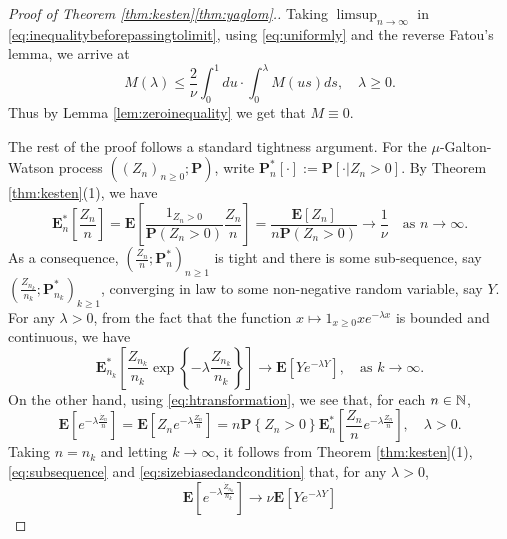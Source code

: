 \documentclass[12pt]{amsart}
\numberwithin{equation}{section}
\newcommand{\prob}{\mathbf P}
\newcommand{\brac}[1]{\left[ #1 \right]}
\newcommand{\set}[1]{\left\{ #1 \right\}}
\newcommand{\expct}{\mathbf E}
\begin{document}
\begin{proof}[Proof of Theorem \ref{thm:kesten}\eqref{thm:yaglom}.]
    Taking $\limsup_{n\to\infty}$ in
    \eqref{eq:inequalitybeforepassingtolimit}, using \eqref{eq:uniformly} and the reverse Fatou's lemma, we arrive at
\begin{equation*}
	    M(\lambda)
    \leq
        \frac{2}{\nu}\int_0^1du
    \cdot
    	\int_0^\lambda M(us)ds,
    \quad
    	\lambda\geq 0.
\end{equation*}
	Thus by Lemma \ref{lem:zeroinequality} we get that $M\equiv 0$.
\par
	The rest of the proof follows a standard tightness argument.
For the $\mu$-Galton-Watson process $((Z_n)_{n\ge 0};\prob)$, 
	write $\prob_n^*[\cdot]:=\prob[\cdot|Z_n>0]$.
By Theorem \ref{thm:kesten}(1), we have
\begin{equation*}
	    \expct_n^*\brac{\frac{Z_n}{n}}
	=
		 \expct\brac{\frac{1_{Z_n>0}}{\prob(Z_n>0)}\frac{Z_n}{n}}
	=
	   	     \frac{\expct\brac{Z_n}}{n\prob(Z_n>0)}
    \to
        \frac{1}{\nu}
   \quad
				\text{as }n\to\infty.
\end{equation*}
	As a consequence, $(\frac{Z_n}{n};\prob_n^*)_{n\ge 1}$ is tight and there is some sub-sequence, say $(\frac{Z_{n_k}}{n_k};\prob_{n_k}^*)_{k\ge 1}$, converging in law to some non-negative random variable, say $Y$.
		For any $\lambda > 0$,
	from the fact that the function $x\mapsto 1_{x\geq 0}xe^{-\lambda x}$ is bounded and continuous, we have
\begin{equation}
\label{eq:subsequence}
	    \expct_{n_k}^*\brac{\frac{Z_{n_k}}{n_k}\exp\set{-\lambda\frac{Z_{n_k}}{n_k}}}
	\to
	    \expct\brac{Ye^{-\lambda Y}},
	\quad
				\text{as }k\to\infty.
\end{equation}
	On the other hand, using \eqref{eq:htransformation}, we see that, for each $n\in\mathbb N$,
\begin{equation}
\label{eq:sizebiasedandcondition}
	    \expct\brac{e^{-\lambda\frac{\dot Z_n}{n}}}
	=
	    \expct\brac{Z_n e^{-\lambda\frac{Z_n}{n}}}
	=
		n\prob\set{Z_n>0}\expct_n^*\brac{\frac{Z_n}{n}e^{-\lambda\frac{Z_n}{n}}},
		\quad \lambda > 0.
	\end{equation}
	Taking $n=n_k$ and letting $k\to\infty$, it follows from 
Theorem \ref{thm:kesten}(1),
	\eqref{eq:subsequence} and \eqref{eq:sizebiasedandcondition} that,
		for any $\lambda >0$,
	\begin{equation*}
	    \expct\brac{e^{-\lambda\frac{\dot Z_{n_k}}{n_k}}}
	\to
		\nu\expct\brac{Ye^{-\lambda Y}}

\end{equation*}
\end{proof}
\end{document}
